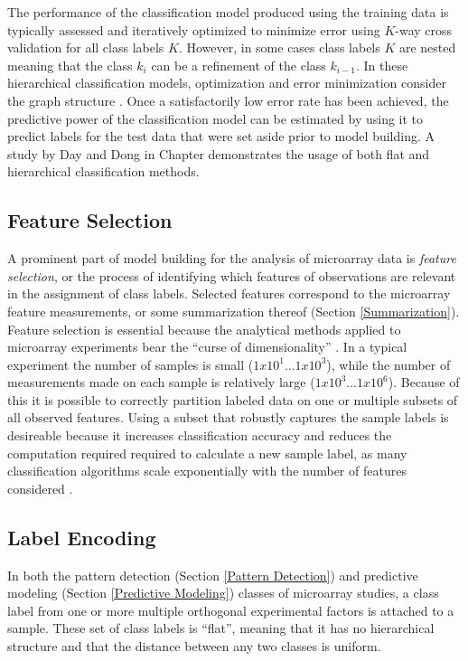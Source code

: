 The performance of the classification model produced using the training data is
typically assessed and iteratively optimized to minimize error using $K$-way
cross validation for all class labels $K$.  However, in some cases class labels
$K$ are nested meaning that the class $k_{i}$ can be a refinement of the
class $k_{i-1}$.  In these hierarchical classification models, optimization and
error minimization consider the graph structure \cite{pachinko}.  Once a
satisfactorily low error rate has been achieved, the predictive power of the
classification model can be estimated by using it to predict labels for the
test data that were set aside prior to model building.  A study by Day and Dong
in Chapter \classchapter demonstrates the usage of both flat and hierarchical
classification methods.

\subsection{Feature Selection}
\label{Feature Selection}

A prominent part of model building for the analysis of microarray data is
\emph{feature selection}, or the process of identifying which features of
observations are relevant in the assignment of class labels.  Selected
features correspond to the microarray feature measurements, or some
summarization thereof (Section \ref{Summarization}).  Feature selection is
essential because the analytical methods applied to microarray experiments bear
the ``curse of dimensionality'' \cite{Bellman_1957}.  In a typical experiment
the number of samples is small ($1x10^1 \dots 1x10^3$), while the number of
measurements made on each sample is relatively large ($1x10^3 \dots 1x10^6$).
Because of this it is possible to correctly partition labeled data on one or
multiple subsets of all observed features.  Using a subset that robustly
captures the sample labels is desireable because it increases classification
accuracy and reduces the computation required required to calculate a new
sample label, as many classification algorithms scale exponentially with the
number of features considered \cite{john94irrelevant}.

\subsection{Label Encoding}
\label{Label Encoding}

In both the pattern detection (Section \ref{Pattern Detection}) and
predictive modeling (Section \ref{Predictive Modeling}) classes of microarray
studies, a class label from one or more multiple orthogonal experimental
factors is attached to a sample.  These set of class labels is ``flat'',
meaning that it has no hierarchical structure and that the distance between any
two classes is uniform.  


